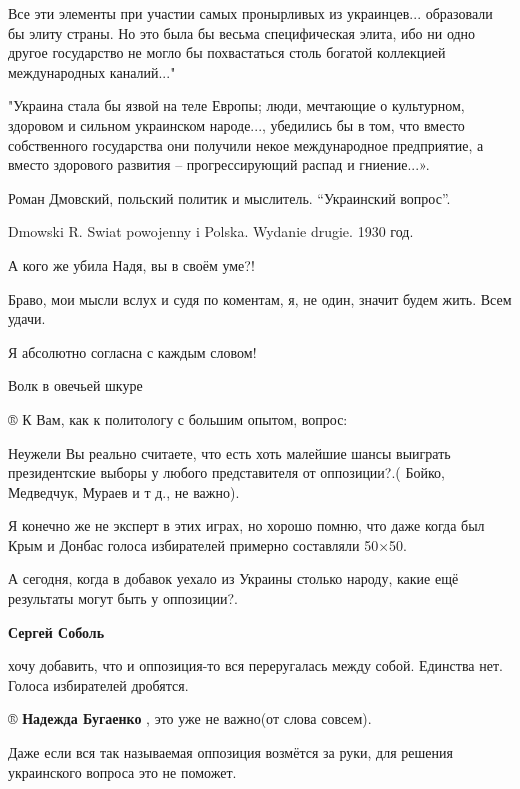 \begin{itemize}
\begin{itemize}
Все эти элементы при участии самых пронырливых из украинцев... образовали бы
элиту страны. Но это была бы весьма специфическая элита, ибо ни одно другое
государство не могло бы похвастаться столь богатой коллекцией международных
каналий..."

"Украина стала бы язвой на теле Европы; люди, мечтающие о культурном, здоровом
и сильном украинском народе..., убедились бы в том, что вместо собственного
государства они получили некое международное предприятие, а вместо здорового
развития – прогрессирующий распад и гниение...».

Роман Дмовский, польский политик и мыслитель. \enquote{Украинский вопрос}.

Dmowski R. Swiat powojenny i Polska. Wydanie drugie. 1930 год.

А кого же убила Надя, вы в своём уме?!

\end{itemize} %


Браво, мои мысли вслух и судя по коментам, я, не один, значит будем жить. Всем
удачи.

Я абсолютно согласна с каждым словом!

Волк в овечьей шкуре


® К Вам, как к политологу с большим опытом, вопрос:

Неужели Вы реально считаете, что есть хоть малейшие шансы выиграть
президентские выборы у любого представителя от оппозиции?.( Бойко, Медведчук,
Мураев и т д., не важно).

Я конечно же не эксперт в этих играх, но хорошо помню, что даже когда был Крым
и Донбас голоса избирателей примерно составляли 50×50.

А сегодня, когда в добавок уехало из Украины столько народу, какие ещё
результаты могут быть у оппозиции?.

\begin{itemize} %
\textbf{Сергей Соболь}

хочу добавить, что и оппозиция-то вся переругалась между собой. Единства нет. Голоса избирателей дробятся.

® \textbf{Надежда Бугаенко} , это уже не важно(от слова совсем).

Даже если вся так называемая оппозиция возмётся за руки, для решения
украинского вопроса это не поможет.


\end{itemize}
\end{itemize}
